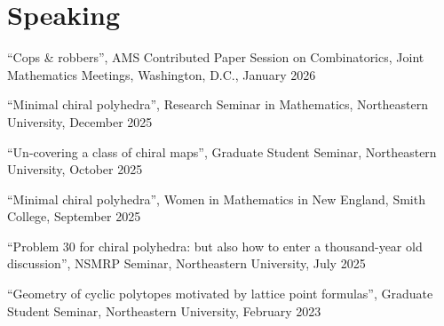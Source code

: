 \section*{Speaking}
``Cops \& robbers'', AMS Contributed Paper Session on Combinatorics, Joint Mathematics Meetings, Washington, D.C., January 2026
\smallskip

``Minimal chiral polyhedra'', Research Seminar in Mathematics, Northeastern University, December 2025
\smallskip

``Un-covering a class of chiral maps'', Graduate Student Seminar, Northeastern University, October 2025
\smallskip

``Minimal chiral polyhedra'', Women in Mathematics in New England, Smith College, September 2025
\smallskip

``Problem 30 for chiral polyhedra: but also how to enter a thousand-year old discussion'', NSMRP Seminar, Northeastern University, July 2025
\smallskip

``Geometry of cyclic polytopes motivated by lattice point formulas'', Graduate Student Seminar, Northeastern University, February 2023